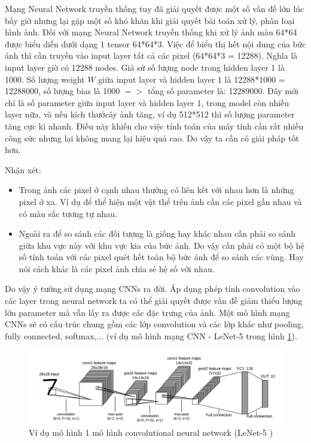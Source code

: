 Mạng Neural Network truyền thống tuy đã giải quyết  được một số vấn đề lớn lúc bấy giờ nhưng lại gặp một số khó khăn khi giải quyết bài toán xử lý, phân loại hình ảnh.
Đối với mạng Neural Network truyền thống khi xử lý ảnh màu 64*64 được biểu diễn dưới dạng 1 tensor 64*64*3. Việc để biểu thị hết nội dung của bức ảnh thì cần truyền vào input layer tất cả các pixel (64*64*3 = 12288). Nghĩa là input layer giờ có 12288 nodes. Giả sử số lượng node trong hidden layer 1 là 1000. Số lượng weight $W$ giữa input layer và hidden layer 1 là 12288*1000 = 12288000, số lượng bias là 1000 $=>$ tổng số parameter là: 12289000. Đây mới chỉ là số parameter giữa input layer và hidden layer 1, trong model còn nhiều layer nữa, và nếu kích thướcây ảnh tăng, ví dụ 512*512 thì số lượng parameter tăng cực kì nhanh. Điều này khiến cho việc tính toán của máy tính cần rất nhiều công sức nhưng lại không mang lại hiệu quả cao. Do vậy ta cần có giải pháp tốt hơn.

Nhận xét:
\begin{itemize}
\item Trong ảnh các pixel ở cạnh nhau thường có liên kết với nhau hơn là những pixel ở xa. Ví dụ để thể hiện một vật thể trên ảnh cần các pixel gần nhau và có màu sắc tương tự nhau.
\item Ngoài ra để so sánh các đối tượng là giống hay khác nhau cần phải so sánh giữa khu vực này với khu vực kia của bức ảnh. Do vậy cần phải có một bộ hệ số tính toán với các pixel quét hết toàn bộ bức ảnh để so sánh các vùng. Hay nói cách khác là các pixel ảnh chia sẻ hệ số với nhau.
\end{itemize}
Do vậy ý tưởng sử dụng mạng CNNs ra đời. Áp dụng phép tính convolution vào các layer trong neural network ta có thể giải quyết được vấn đề giảm thiểu lượng lớn parameter mà vẫn lấy ra được các đặc trưng của ảnh. Một mô hình mạng CNNs sẽ có cấu trúc chung gồm các lớp convolution và các lớp khác như pooling, fully connected, softmax,... (ví dụ mô hình mạng CNN - LeNet-5 trong hình \ref{fig:lenet}).

\FloatBarrier
\begin{figure}[htp]
\begin{center}
\includegraphics[scale=1]{chap2/c2_figs/18.png}
\end{center}
\caption{Ví dụ mô hình 1 mô hình convolutional neural network (LeNet-5 \cite{lecun1998gradient})}
\label{fig:lenet}
\end{figure}
\FloatBarrier


